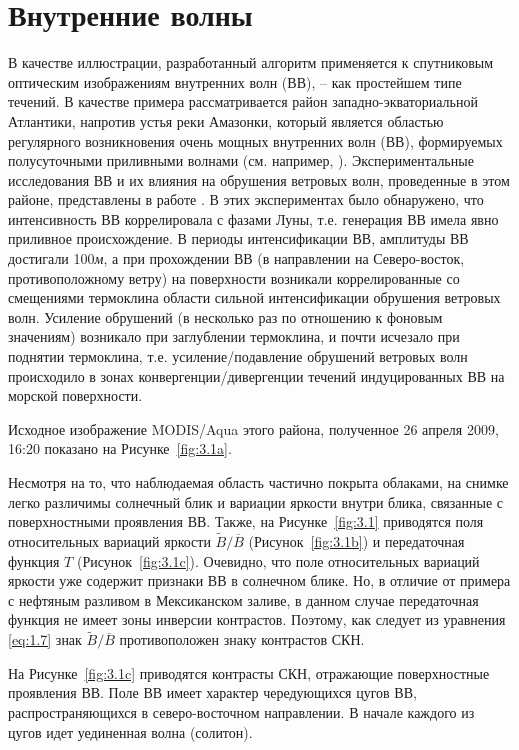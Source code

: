 \section{Внутренние волны} \label{sec:3.1}


В качестве иллюстрации, разработанный алгоритм применяется к спутниковым оптическим изображениям внутренних волн (ВВ), -- как простейшем типе течений. В качестве примера рассматривается район западно-экваториальной Атлантики, напротив устья реки Амазонки, который является областью регулярного возникновения очень мощных внутренних волн (ВВ), формируемых полусуточными приливными волнами (см. например, \citep{Ivanov1993}). Экспериментальные исследования ВВ и их влияния на обрушения ветровых волн, проведенные в этом районе, представлены в работе \citep{1986}. В этих экспериментах было обнаружено, что интенсивность ВВ коррелировала с фазами Луны, т.е. генерация ВВ имела явно приливное происхождение. В периоды интенсификации ВВ, амплитуды ВВ достигали 100\textit{м}, а при прохождении ВВ (в направлении на Северо-восток, противоположному ветру) на поверхности возникали коррелированные со смещениями термоклина области сильной интенсификации обрушения ветровых волн. Усиление обрушений (в несколько раз по отношению к фоновым значениям) возникало при заглублении термоклина, и почти исчезало при поднятии термоклина, т.е. усиление/подавление обрушений ветровых волн происходило в зонах конвергенции/дивергенции течений индуцированных ВВ на морской поверхности. 

Исходное изображение MODIS/Aqua этого района, полученное 26 апреля 2009, 16:20 показано на Рисунке~\ref{fig:3.1a}.

Несмотря на то, что наблюдаемая область частично покрыта облаками, на снимке легко различимы солнечный блик и вариации яркости внутри блика, связанные с поверхностными проявления ВВ. Также, на Рисунке~\ref{fig:3.1} приводятся поля относительных вариаций яркости $\widetilde{B}/\overline{B}$ (Рисунок~\ref{fig:3.1b}) и передаточная функция $T$ (Рисунок~\ref{fig:3.1c}). Очевидно, что поле относительных вариаций яркости уже содержит признаки ВВ в солнечном блике. Но, в отличие от примера с нефтяным разливом в Мексиканском заливе, в данном случае передаточная функция не имеет зоны инверсии контрастов. Поэтому, как следует из уравнения \eqref{eq:1.7} знак $\widetilde{B}/\overline{B}$ противоположен знаку контрастов СКН.

На Рисунке~\ref{fig:3.1c} приводятся контрасты СКН, отражающие поверхностные проявления ВВ. Поле ВВ имеет характер чередующихся цугов ВВ, распространяющихся в северо-восточном направлении. В начале каждого из цугов идет уединенная волна (солитон).

